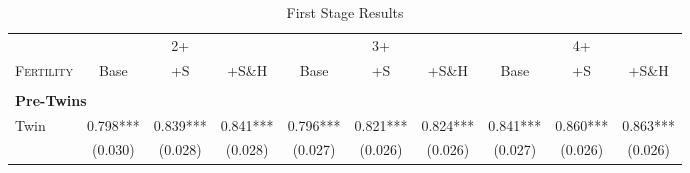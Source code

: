 \begin{landscape}\begin{table}[htpb!]\caption{First Stage Results} 
\label{TWINtab:FS}\begin{center}\begin{tabular}{lccccccccc}
\toprule \toprule 
&\multicolumn{3}{c}{2+}&\multicolumn{3}{c}{3+}&\multicolumn{3}{c}{4+}\\ \cmidrule(r){2-4} \cmidrule(r){5-7} \cmidrule(r){8-10} 
\textsc{Fertility}&Base&+S&+S\&H&Base&+S&+S\&H&Base&+S&+S\&H\\ \midrule 
\begin{footnotesize}\end{footnotesize}& 
\begin{footnotesize}\end{footnotesize}& 
\begin{footnotesize}\end{footnotesize}& 
\begin{footnotesize}\end{footnotesize}& 
\begin{footnotesize}\end{footnotesize}& 
\begin{footnotesize}\end{footnotesize}& 
\begin{footnotesize}\end{footnotesize}& 
\begin{footnotesize}\end{footnotesize}& 
\begin{footnotesize}\end{footnotesize}& 
\begin{footnotesize}\end{footnotesize}\\ 
\multicolumn{10}{l}{\textbf{Pre-Twins}}\\ 
Twin&0.798***&0.839***&0.841***&0.796***&0.821***&0.824***&0.841***&0.860***&0.863***\\
&(0.030)&(0.028)&(0.028)&(0.027)&(0.026)&(0.026)&(0.027)&(0.026)&(0.026)\\

\end{tabular}
\end{center}
\end{table}
\end{landscape}
